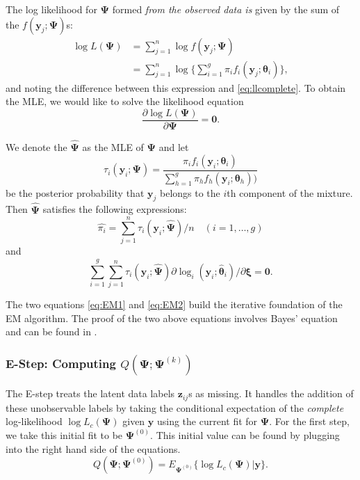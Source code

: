 \documentclass{article}\usepackage[]{graphicx}\usepackage[]{xcolor}
\theoremstyle{plain}
\theoremstyle{definition}
\theoremstyle{remark}
\newcommand{\boldz}{\mathbf{z}}
\newcommand{\boldy}{\mathbf{y}}
\newcommand{\boldtheta}{\boldsymbol{\theta}}
\newcommand{\boldPsi}{\boldsymbol{\Psi}}
\newcommand{\boldxi}{\boldsymbol{\xi}}
\begin{document}
The log likelihood for $\boldPsi$ formed \textit{from the observed data is} given by the sum of the $f(\boldy_j ; \boldPsi)$s:
\begin{align*}
    \log L(\boldPsi) &= \sum_{j=1}^n \log f(\boldy_j ; \boldPsi) \\
    &=  \sum_{j=1}^n \log \{ \sum_{i=1}^g \pi_i f_i (\boldy_j ; \boldtheta_i) \},
\end{align*}
and noting the difference between this expression and \eqref{eq:llcomplete}.
To obtain the MLE, we would like to solve the likelihood equation 
\begin{equation*}
    \frac{\partial \log L(\boldPsi)}{\partial \boldPsi} = \textbf{0}. 
\end{equation*}

We denote the $\hat{\boldPsi}$ as the MLE of $\boldPsi$ and let
\begin{equation} \label{eq:EMtau}
    \tau_i (\boldy_i ; \boldPsi) = \frac{\pi_i f_i (\boldy_i;\boldtheta_i)}{\sum_{h=1}^g \pi_h f_h (\boldy_i;\boldtheta_h))}
\end{equation}
be the posterior probability that $\boldy_j$ belongs to the $i$th component of the mixture. %
Then $\hat{\boldPsi}$ satisfies the following expressions:
\begin{equation} \label{eq:EM1}
    \hat{\pi_i} = \sum_{j=1}^n \tau_i (\boldy_i ; \hat{\boldPsi}) / n \quad (i = 1, \dots, g)
\end{equation}
and
\begin{equation} \label{eq:EM2}
    \sum_{i=1}^g \sum_{j=1}^n \tau_i (\boldy_i ; \hat{\boldPsi})  \partial \log_i (\boldy_i;\hat{\boldtheta}_i) / \partial \boldxi = \textbf{0}.
\end{equation}

The two equations \eqref{eq:EM1} and \eqref{eq:EM2} build the iterative foundation of the EM algorithm. The proof of the two above equations involves Bayes' equation and can be found in \cite[Section 1.4]{EM_Book}.

\subsubsection*{E-Step: Computing $Q(\boldPsi; \boldPsi^{(k)})$}
The E-step treats the latent data labels $\boldz_{ij}$s as missing. It handles the addition of these unobservable labels by taking the conditional expectation of the \textit{complete} log-likelihood $\log L_c (\boldPsi)$ given $\boldy$ using the current fit for $\boldPsi$. For the first step, we take this initial fit to be $\boldPsi^{(0)}$. This initial value can be found by plugging into the right hand side of the equations.
\begin{equation} \label{eq:EMFirstStep}
Q(\boldPsi; \boldPsi^{(0)}) = E_{\boldPsi^{(0)}} \{\log L_c{(\boldPsi)} \vert \boldy\}.
\end{equation}
\end{document}
